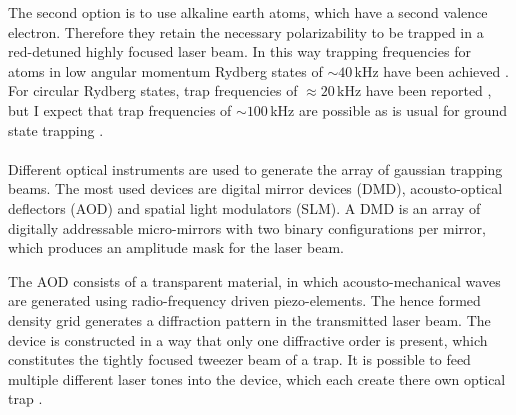 The second option is to use alkaline earth atoms, which have a second valence electron. Therefore they retain the necessary polarizability to be trapped in a red-detuned highly focused laser beam. In this way trapping frequencies for atoms in low angular momentum Rydberg states of $\sim40\,$kHz have been achieved \cite{wilsonTrappingAlkalineEarth2022}. For circular Rydberg states, trap frequencies of $\approx20\,$kHz have been reported \cite{holzlLongLivedCircularRydberg2024}, but I expect that trap frequencies of $\sim100\,$kHz are possible as is usual for ground state trapping \cite{nogretteSingleAtomTrappingHolographic2014}.\\\\
Different optical instruments are used to generate the array of gaussian trapping beams. The most used devices are digital mirror devices (DMD), acousto-optical deflectors (AOD) and spatial light modulators (SLM). A DMD is an array of digitally addressable micro-mirrors with two binary configurations per mirror, which  produces an amplitude mask for the laser beam. 

The AOD consists of a transparent material, in which acousto-mechanical waves are generated using radio-frequency driven piezo-elements. The hence formed density grid generates a diffraction pattern in the transmitted laser beam. The device is constructed in a way that only one diffractive order is present, which constitutes the tightly focused tweezer beam of a trap. It is possible to feed multiple different laser tones into the device, which each create there own optical trap \cite{masterThesisAOD}. 

